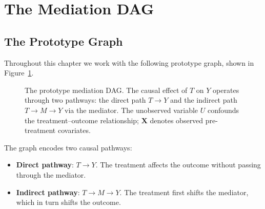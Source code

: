 \documentclass[master.tex]{subfiles}
\begin{document}
\section{The Mediation DAG}
\label{w8:sec:dag}

\subsection{The Prototype Graph}

Throughout this chapter we work with the following prototype graph,
shown in Figure~\ref{w8:fig:mediation-dag}.

\begin{figure}[h]
\centering
{}
\caption{The prototype mediation DAG.  The causal effect of $T$ on $Y$
operates through two pathways: the direct path $T \to Y$ and the
indirect path $T \to M \to Y$ via the mediator.  The unobserved
variable $U$ confounds the treatment--outcome relationship;
$\mathbf{X}$ denotes observed pre-treatment covariates.}
\label{w8:fig:mediation-dag}
\end{figure}

\noindent The graph encodes two causal pathways:
\begin{itemize}
  \item \textbf{Direct pathway}: $T \to Y$.  The treatment affects the
    outcome without passing through the mediator.
  \item \textbf{Indirect pathway}: $T \to M \to Y$.  The treatment first
    shifts the mediator, which in turn shifts the outcome.
\end{itemize}
\end{document}
